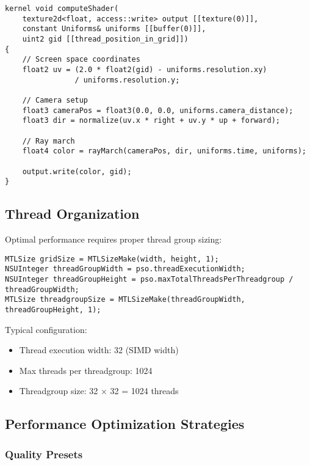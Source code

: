 \documentclass[12pt,a4paper]{article}
\theoremstyle{definition}
\theoremstyle{remark}
\begin{document}
\begin{lstlisting}[style=metalstyle, caption=Main compute kernel]
kernel void computeShader(
    texture2d<float, access::write> output [[texture(0)]],
    constant Uniforms& uniforms [[buffer(0)]],
    uint2 gid [[thread_position_in_grid]])
{
    // Screen space coordinates
    float2 uv = (2.0 * float2(gid) - uniforms.resolution.xy) 
                / uniforms.resolution.y;
    
    // Camera setup
    float3 cameraPos = float3(0.0, 0.0, uniforms.camera_distance);
    float3 dir = normalize(uv.x * right + uv.y * up + forward);
    
    // Ray march
    float4 color = rayMarch(cameraPos, dir, uniforms.time, uniforms);
    
    output.write(color, gid);
}
\end{lstlisting}

\subsection{Thread Organization}

Optimal performance requires proper thread group sizing:

\begin{lstlisting}[style=metalstyle, caption=Thread group configuration]
MTLSize gridSize = MTLSizeMake(width, height, 1);
NSUInteger threadGroupWidth = pso.threadExecutionWidth;
NSUInteger threadGroupHeight = pso.maxTotalThreadsPerThreadgroup / threadGroupWidth;
MTLSize threadgroupSize = MTLSizeMake(threadGroupWidth, threadGroupHeight, 1);
\end{lstlisting}

Typical configuration:
\begin{itemize}
    \item Thread execution width: 32 (SIMD width)
    \item Max threads per threadgroup: 1024
    \item Threadgroup size: 32 × 32 = 1024 threads
\end{itemize}

\subsection{Performance Optimization Strategies}

\subsubsection{Quality Presets}
\end{document}
